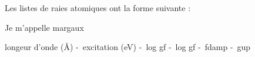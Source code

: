  Les listes de raies atomiques ont la forme suivante :  \newline

 Je m'appelle margaux 

 longeur d'onde (Å) -\ excitation (eV) -\ log gf -\ log gf -\ fdamp -\ gup \newline



